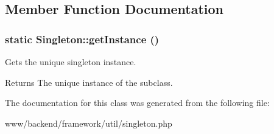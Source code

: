 \subsection{Member Function Documentation}
\hypertarget{classSingleton_a475e05eea7a862ab6e22d7599ead8dc1}{
\subsubsection[{getInstance}]{\setlength{\rightskip}{0pt plus 5cm}static Singleton::getInstance ()}}
\label{classSingleton_a475e05eea7a862ab6e22d7599ead8dc1}
Gets the unique singleton instance.

\begin{DoxyReturn}{Returns}
The unique instance of the subclass. 
\end{DoxyReturn}


The documentation for this class was generated from the following file:\begin{DoxyCompactItemize}
\item 
www/backend/framework/util/singleton.php\end{DoxyCompactItemize}
